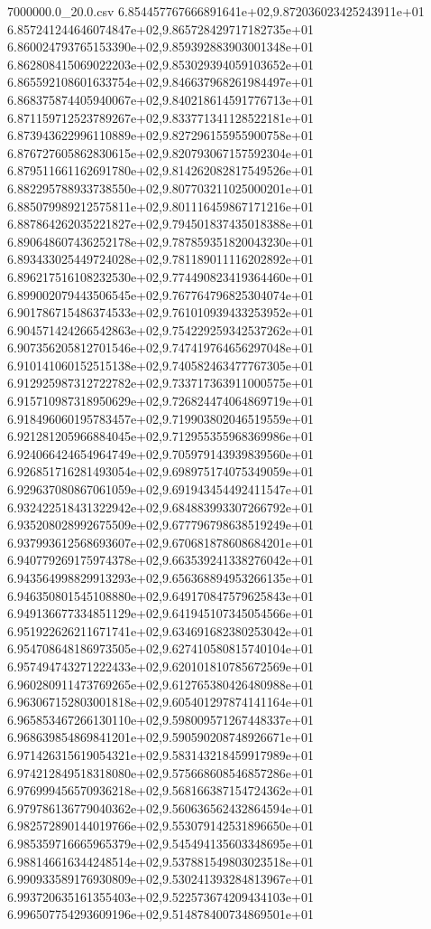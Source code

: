\begin{filecontents*}{7000000.0_20.0.csv}
6.854457767666891641e+02,9.872036023425243911e+01
6.857241244646074847e+02,9.865728429717182735e+01
6.860024793765153390e+02,9.859392883903001348e+01
6.862808415069022203e+02,9.853029394059103652e+01
6.865592108601633754e+02,9.846637968261984497e+01
6.868375874405940067e+02,9.840218614591776713e+01
6.871159712523789267e+02,9.833771341128522181e+01
6.873943622996110889e+02,9.827296155955900758e+01
6.876727605862830615e+02,9.820793067157592304e+01
6.879511661162691780e+02,9.814262082817549526e+01
6.882295788933738550e+02,9.807703211025000201e+01
6.885079989212575811e+02,9.801116459867171216e+01
6.887864262035221827e+02,9.794501837435018388e+01
6.890648607436252178e+02,9.787859351820043230e+01
6.893433025449724028e+02,9.781189011116202892e+01
6.896217516108232530e+02,9.774490823419364460e+01
6.899002079443506545e+02,9.767764796825304074e+01
6.901786715486374533e+02,9.761010939433253952e+01
6.904571424266542863e+02,9.754229259342537262e+01
6.907356205812701546e+02,9.747419764656297048e+01
6.910141060152515138e+02,9.740582463477767305e+01
6.912925987312722782e+02,9.733717363911000575e+01
6.915710987318950629e+02,9.726824474064869719e+01
6.918496060195783457e+02,9.719903802046519559e+01
6.921281205966884045e+02,9.712955355968369986e+01
6.924066424654964749e+02,9.705979143939839560e+01
6.926851716281493054e+02,9.698975174075349059e+01
6.929637080867061059e+02,9.691943454492411547e+01
6.932422518431322942e+02,9.684883993307266792e+01
6.935208028992675509e+02,9.677796798638519249e+01
6.937993612568693607e+02,9.670681878608684201e+01
6.940779269175974378e+02,9.663539241338276042e+01
6.943564998829913293e+02,9.656368894953266135e+01
6.946350801545108880e+02,9.649170847579625843e+01
6.949136677334851129e+02,9.641945107345054566e+01
6.951922626211671741e+02,9.634691682380253042e+01
6.954708648186973505e+02,9.627410580815740104e+01
6.957494743271222433e+02,9.620101810785672569e+01
6.960280911473769265e+02,9.612765380426480988e+01
6.963067152803001818e+02,9.605401297874141164e+01
6.965853467266130110e+02,9.598009571267448337e+01
6.968639854869841201e+02,9.590590208748926671e+01
6.971426315619054321e+02,9.583143218459917989e+01
6.974212849518318080e+02,9.575668608546857286e+01
6.976999456570936218e+02,9.568166387154724362e+01
6.979786136779040362e+02,9.560636562432864594e+01
6.982572890144019766e+02,9.553079142531896650e+01
6.985359716665965379e+02,9.545494135603348695e+01
6.988146616344248514e+02,9.537881549803023518e+01
6.990933589176930809e+02,9.530241393284813967e+01
6.993720635161355403e+02,9.522573674209434103e+01
6.996507754293609196e+02,9.514878400734869501e+01

\end{filecontents*}
